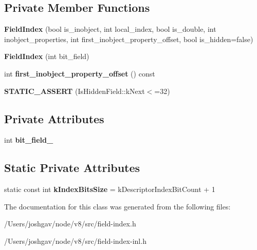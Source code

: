 \subsection*{Private Member Functions}
\begin{DoxyCompactItemize}
\item 
{\bfseries Field\+Index} (bool is\+\_\+inobject, int local\+\_\+index, bool is\+\_\+double, int inobject\+\_\+properties, int first\+\_\+inobject\+\_\+property\+\_\+offset, bool is\+\_\+hidden=false)\hypertarget{classv8_1_1internal_1_1_field_index_ab4785f4fd56dd7ca6316708112ca532f}{}\label{classv8_1_1internal_1_1_field_index_ab4785f4fd56dd7ca6316708112ca532f}

\item 
{\bfseries Field\+Index} (int bit\+\_\+field)\hypertarget{classv8_1_1internal_1_1_field_index_aa564e0576431517b5e8a4a2e3157c57c}{}\label{classv8_1_1internal_1_1_field_index_aa564e0576431517b5e8a4a2e3157c57c}

\item 
int {\bfseries first\+\_\+inobject\+\_\+property\+\_\+offset} () const \hypertarget{classv8_1_1internal_1_1_field_index_a6af45fae78958196155d51228effe2cf}{}\label{classv8_1_1internal_1_1_field_index_a6af45fae78958196155d51228effe2cf}

\item 
{\bfseries S\+T\+A\+T\+I\+C\+\_\+\+A\+S\+S\+E\+RT} (Is\+Hidden\+Field\+::k\+Next$<$=32)\hypertarget{classv8_1_1internal_1_1_field_index_a7fa451b606f815791c4d1d31a48a28b2}{}\label{classv8_1_1internal_1_1_field_index_a7fa451b606f815791c4d1d31a48a28b2}

\end{DoxyCompactItemize}
\subsection*{Private Attributes}
\begin{DoxyCompactItemize}
\item 
int {\bfseries bit\+\_\+field\+\_\+}\hypertarget{classv8_1_1internal_1_1_field_index_a32ef139ed69030adb903b8d3750c5370}{}\label{classv8_1_1internal_1_1_field_index_a32ef139ed69030adb903b8d3750c5370}

\end{DoxyCompactItemize}
\subsection*{Static Private Attributes}
\begin{DoxyCompactItemize}
\item 
static const int {\bfseries k\+Index\+Bits\+Size} = k\+Descriptor\+Index\+Bit\+Count + 1\hypertarget{classv8_1_1internal_1_1_field_index_ac8068be1804f1e9abb86966543873994}{}\label{classv8_1_1internal_1_1_field_index_ac8068be1804f1e9abb86966543873994}

\end{DoxyCompactItemize}


The documentation for this class was generated from the following files\+:\begin{DoxyCompactItemize}
\item 
/\+Users/joshgav/node/v8/src/field-\/index.\+h\item 
/\+Users/joshgav/node/v8/src/field-\/index-\/inl.\+h\end{DoxyCompactItemize}
